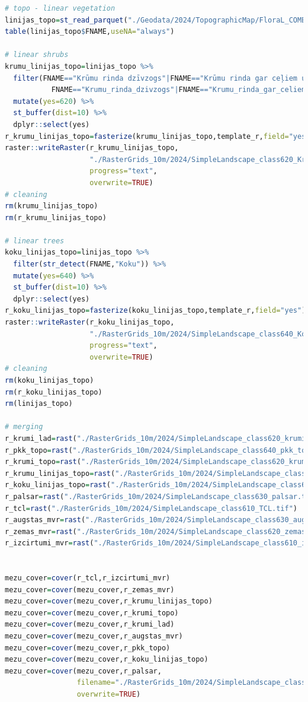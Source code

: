 \documentclass[
]{book}
\begin{document}
\begin{lstlisting}[language=R]
# topo - linear vegetation
linijas_topo=st_read_parquet("./Geodata/2024/TopographicMap/FloraL_COMB.parquet")
table(linijas_topo$FNAME,useNA="always")

# linear shrubs
krumu_linijas_topo=linijas_topo %>% 
  filter(FNAME=="Krūmu rinda dzīvzogs"|FNAME=="Krūmu rinda gar ceļiem upēm"|
           FNAME=="Krumu_rinda_dzivzogs"|FNAME=="Krumu_rinda_gar_celiem_upem") %>% 
  mutate(yes=620) %>% 
  st_buffer(dist=10) %>% 
  dplyr::select(yes)
r_krumu_linijas_topo=fasterize(krumu_linijas_topo,template_r,field="yes")
raster::writeRaster(r_krumu_linijas_topo,
                    "./RasterGrids_10m/2024/SimpleLandscape_class620_KrumuLinijas_topo.tif",
                    progress="text",
                    overwrite=TRUE)
# cleaning
rm(krumu_linijas_topo)
rm(r_krumu_linijas_topo)

# linear trees
koku_linijas_topo=linijas_topo %>% 
  filter(str_detect(FNAME,"Koku")) %>% 
  mutate(yes=640) %>% 
  st_buffer(dist=10) %>% 
  dplyr::select(yes)
r_koku_linijas_topo=fasterize(koku_linijas_topo,template_r,field="yes")
raster::writeRaster(r_koku_linijas_topo,
                    "./RasterGrids_10m/2024/SimpleLandscape_class640_KokuLinijas_topo.tif",
                    progress="text",
                    overwrite=TRUE)
# cleaning
rm(koku_linijas_topo)
rm(r_koku_linijas_topo)
rm(linijas_topo)

# merging
r_krumi_lad=rast("./RasterGrids_10m/2024/SimpleLandscape_class620_krumi_lad.tif")
r_pkk_topo=rast("./RasterGrids_10m/2024/SimpleLandscape_class640_pkk_topo.tif")
r_krumi_topo=rast("./RasterGrids_10m/2024/SimpleLandscape_class620_krumi_topo.tif")
r_krumu_linijas_topo=rast("./RasterGrids_10m/2024/SimpleLandscape_class620_KrumuLinijas_topo.tif")
r_koku_linijas_topo=rast("./RasterGrids_10m/2024/SimpleLandscape_class640_KokuLinijas_topo.tif")
r_palsar=rast("./RasterGrids_10m/2024/SimpleLandscape_class630_palsar.tif")
r_tcl=rast("./RasterGrids_10m/2024/SimpleLandscape_class610_TCL.tif")
r_augstas_mvr=rast("./RasterGrids_10m/2024/SimpleLandscape_class630_augstas_mvr.tif")
r_zemas_mvr=rast("./RasterGrids_10m/2024/SimpleLandscape_class620_zemas_mvr.tif")
r_izcirtumi_mvr=rast("./RasterGrids_10m/2024/SimpleLandscape_class610_izcirtumi_mvr.tif")


mezu_cover=cover(r_tcl,r_izcirtumi_mvr)
mezu_cover=cover(mezu_cover,r_zemas_mvr)
mezu_cover=cover(mezu_cover,r_krumu_linijas_topo)
mezu_cover=cover(mezu_cover,r_krumi_topo)
mezu_cover=cover(mezu_cover,r_krumi_lad)
mezu_cover=cover(mezu_cover,r_augstas_mvr)
mezu_cover=cover(mezu_cover,r_pkk_topo)
mezu_cover=cover(mezu_cover,r_koku_linijas_topo)
mezu_cover=cover(mezu_cover,r_palsar,
                 filename="./RasterGrids_10m/2024/SimpleLandscape_class600_meziem_premask.tif",
                 overwrite=TRUE)



\end{lstlisting}
\end{document}
